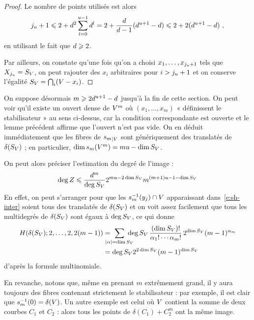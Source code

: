 \begin{proof}
  Le nombre de points utilisés est alors
  \begin{equation}
    j_u + 1
    \leqslant
    2 + d^2 \sum_{l=0}^{u-1} d^l
    =
    2 + \frac{d}{d-1} (d^{u+1} - d)
    \leqslant
    2 + 2 (d^{u+1} - d)
    \text{ ,}
  \end{equation}
  en utilisant le fait que \( d \geqslant 2 \).

  Par ailleurs, on constate qu'une fois qu'on a choisi \( x_1, \dots,
    x_{j_u+1} \) tels que \( X_{j_u} = S_V \), on peut rajouter
  des \( x_i \) arbitraires pour \( i > j_u + 1 \) et on conserve
  l'égalité \( S_V = \bigcap_i (V - x_i) \).
\end{proof}

On suppose désormais \( m \geqslant 2 d^{u+1} - d \) jusqu'à la fin de
cette section.  On peut voir qu'il existe un ouvert dense de \( V^m \) où
\( (x_1, \dots, x_m) \) « définissent le stabilisateur » au sens ci-dessus,
car la condition correspondante est ouverte et le lemme précédent affirme que
l'ouvert n'est pas vide. On en déduit immédiatement que les fibres de \(
  {s_m}_{|V} \) sont génériquement des translatés de \( \delta(S_V) \)
; en particulier, \( \dim s_m(V^m) = m u - \dim S_V \).

On peut alors préciser l'estimation du degré de l'image :
\begin{equation}
  \deg Z
  \leqslant
  \frac{ d^m }{ \deg S_V }
  2^{mu - 2\dim S_V} m^{(m+1)u - 1 - \dim S_V}
\end{equation}
En effet, on peut s'arranger pour que les \( s_m^{-1}(y_j) \cap V \)
apparaissant dans~\eqref{e:sh-inter} soient tous des translatés de \(
  \delta(S_V) \) et on voit assez facilement que tous les multidegrés de
\( \delta(S_V) \) sont égaux à \( \deg S_V \), ce qui donne
\begin{align}
  H( \delta(S_\avar); 2, \dots, 2, 2(m-1) )
  & =
  \ \sum_{ \mathclap{\lgr\alpha = \dim S_\avar} } \
  \deg S_\avar
  \, \frac{ (\dim S_\avar)! }{ \alpha_1! \cdots \alpha_m! }
  \, 2^{\dim S_\avar} (m-1)^{\alpha_m}
  \\ & =
  \deg S_\avar
  2^{2\dim S_\avar} (m-1)^{\dim S_\avar}
\end{align}
d'après la formule multinomiale.

En revanche, notons que, même en prenant \( m \) extrêmement grand, il y aura
toujours des fibres contenant strictement le stabilisateur : par exemple, il
est clair que \( s_m^{-1}(0) = \delta(V) \). Un autre exemple est celui où
\( V \) contient la somme de deux courbes \( C_1 \) et \( C_2 \) : alors
tous les points de \( \delta(C_1) + C_2^m \) ont la même image.


